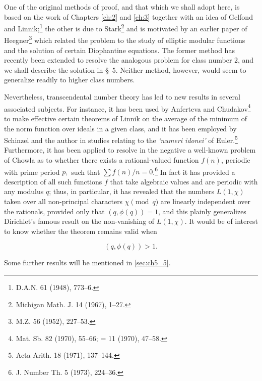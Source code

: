 One of the original methods of proof, and that which we shall adopt here, is based on the work of Chapters \ref{ch:2} and \ref{ch:3} together with an idea of Gelfond and Linnik;\footnote{D.A.N. 61 (1948), 773--6.} the other is due to Stark\footnote{Michigan Math. J. 14 (1967), 1--27.} and is motivated by an earlier paper of Heegner\footnote{M.Z. 56 (1952), 227--53.} which related the problem to the study of elliptic modular functions and the solution of certain Diophantine equations. The former method has recently been extended to resolve the analogous problem for class number 2, and we shall describe the solution in \S~5. Neither method, however, would seem to generalize readily to higher class numbers.

Nevertheless, transcendental number theory has led to new results in several associated subjects. For instance, it has been used by Anferteva and Chudakov\footnote{Mat. Sb. 82 (1970), 55--66; = 11 (1970), 47--58.} to make effective certain theorems of Linnik on the average of the minimum of the norm function over ideals in a given class, and it has been employed by Schinzel and the author in studies relating to the \textit{\lq numeri idonei\rq} of Euler.\footnote{Acta Arith. 18 (1971), 137--144.} Furthermore, it has been applied to resolve in the negative a well-known problem of Chowla as to whether there exists a rational-valued function $f(n)$, periodic with prime period $p,$ such that $\sum f(n)/n = 0$.\footnote{J. Number Th. 5 (1973), 224--36.} In fact it has provided a description of all such functions $f$ that take algebraic values and are periodic with any modulus $q$; thus, in particular, it has revealed that the numbers $L(1,\chi)$ taken over all non-principal characters $\chi \pmod q$ are linearly independent over the rationals, provided only that $(q, \phi(q)) = 1$, and this plainly generalizes Dirichlet's famous result on the non-vanishing of $L(1,\chi)$. It would be of interest to know whether the theorem remains valid when

\[(q,\phi(q))>1.\]

Some further results will be mentioned in \autoref{sec:ch5_5}.

